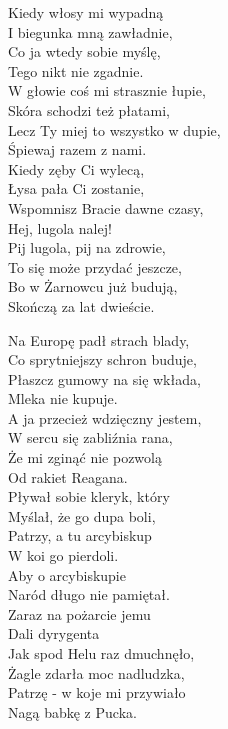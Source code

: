 \begin{multicols}{2}
Kiedy włosy mi wypadną\\
I biegunka mną zawładnie, \\
Co ja wtedy sobie myślę, \\
Tego nikt nie zgadnie.\\

W głowie coś mi strasznie łupie, \\
Skóra schodzi też płatami, \\
Lecz Ty miej to wszystko w dupie, \\
Śpiewaj razem z nami.\\

Kiedy zęby Ci wylecą, \\
Łysa pała Ci zostanie, \\
Wspomnisz Bracie dawne czasy, \\
Hej, lugola nalej!\\

Pij lugola, pij na zdrowie, \\
To się może przydać jeszcze, \\
Bo w Żarnowcu już budują, \\
Skończą za lat dwieście.\\
\newcolumn

Na Europę padł strach blady, \\
Co sprytniejszy schron buduje, \\
Płaszcz gumowy na się wkłada, \\
Mleka nie kupuje.\\

A ja przecież wdzięczny jestem, \\
W sercu się zabliźnia rana, \\
Że mi zginąć nie pozwolą\\
Od rakiet Reagana.\\

Pływał sobie kleryk, który\\
Myślał, że go dupa boli, \\
Patrzy, a tu arcybiskup\\
W koi go pierdoli.\\

Aby o arcybiskupie\\
Naród długo nie pamiętał.\\
Zaraz na pożarcie jemu\\
Dali dyrygenta\\

Jak spod Helu raz dmuchnęło, \\
Żagle zdarła moc nadludzka, \\
Patrzę - w koje mi przywiało\\
Nagą babkę z Pucka.\\


\end{multicols}
